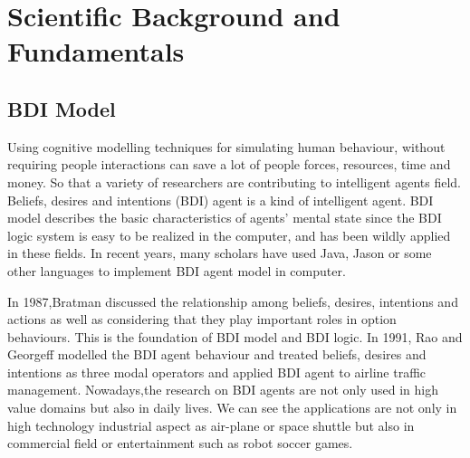 
\section{Scientific Background and Fundamentals}
\subsection{BDI Model}
Using cognitive modelling techniques for simulating human behaviour, without requiring people interactions can save a lot of people forces, resources, time and money. So that a variety of researchers are contributing to intelligent agents field. Beliefs, desires and intentions (BDI) agent is a kind of intelligent agent. BDI model describes the basic characteristics of agents' mental state since the BDI logic system is easy to be realized in the computer, and has been wildly applied in these fields. In recent years, many scholars have used Java, Jason or some other languages to implement BDI agent model in computer. 

In 1987,Bratman\cite{MICHAEL_PlansResource_1988} discussed the relationship among beliefs, desires, intentions and actions as well as considering that they play important roles in option behaviours. This is the foundation of BDI model and BDI logic. In 1991, Rao and Georgeff\cite{Michael_BDIAgency_1999} modelled the BDI agent behaviour and treated beliefs, desires and intentions as three modal operators and applied BDI agent to airline traffic management. Nowadays,the research on BDI agents are not only used in high value domains but also in daily lives. We can see the applications are not only in high technology industrial aspect as air-plane or space shuttle but also in commercial field or entertainment such as robot soccer games.

